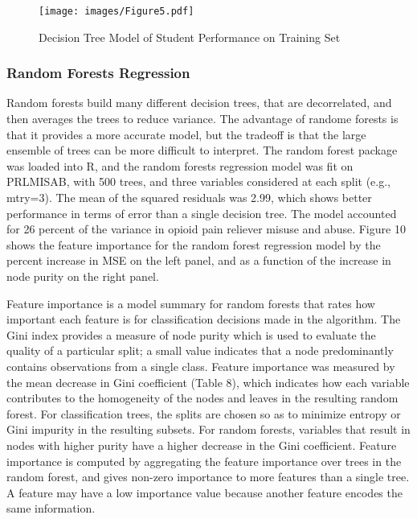 \documentclass[sigconf]{acmart}
\begin{document}
\begin{figure}[!ht]
  \centering\texttt{[image: images/Figure5.pdf]}
  \caption{Decision Tree Model of Student Performance on Training Set}
  \label{f:Figure5}
\end{figure}


\subsubsection{Random Forests Regression}

Random forests build many different decision trees, that are decorrelated, and 
then averages the trees to reduce variance. The advantage of randome forests is 
that it provides a more accurate model, but the tradeoff is that the large 
ensemble of trees can be more difficult to interpret. The random forest package 
was loaded into R, and the random forests regression model was fit on PRLMISAB, 
with 500 trees, and three variables considered at each split (e.g., mtry=3).
The mean of the squared residuals was 2.99, which shows better performance
in terms of error than a single decision tree. The model accounted for 26
percent of the variance in opioid pain reliever misuse and abuse. Figure 10
shows the feature importance for the random forest regression model by the
percent increase in MSE on the left panel, and as a function of the increase
in node purity on the right panel. 


Feature importance is a model summary for random forests 
that rates how important each feature is for classification decisions made 
in the algorithm. The Gini index provides a measure of node purity which is 
used to evaluate the quality of a particular split; a small value indicates 
that a node predominantly contains observations from a single class. 
Feature importance was measured by the mean decrease in Gini coefficient 
(Table 8), which indicates how each variable contributes to the homogeneity 
of the nodes and leaves in the resulting random forest. For classification 
trees, the splits are chosen so as to minimize entropy or Gini impurity in 
the resulting subsets. For random forests, variables that result in nodes 
with higher purity have a higher decrease in the Gini coefficient. Feature 
importance is computed by aggregating the feature importance over trees in 
the random forest, and gives non-zero importance to more features than a 
single tree. A feature may have a low importance value because another feature 
encodes the same information. 
\end{document}
